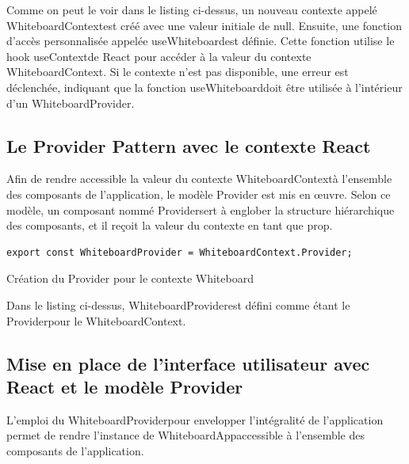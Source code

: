 Comme on peut le voir dans le listing ci-dessus, un nouveau contexte appelé \guillemotleft WhiteboardContext\guillemotright est créé avec une valeur initiale de \guillemotleft null\guillemotright. Ensuite, une fonction d'accès personnalisée appelée \guillemotleft useWhiteboard\guillemotright est définie. Cette fonction utilise le hook \guillemotleft useContext\guillemotright de React pour accéder à la valeur du contexte \guillemotleft WhiteboardContext\guillemotright. Si le contexte n'est pas disponible, une erreur est déclenchée, indiquant que la fonction \guillemotleft useWhiteboard\guillemotright doit être utilisée à l'intérieur d'un \guillemotleft WhiteboardProvider\guillemotright.

\subsection{Le Provider Pattern avec le contexte React}

Afin de rendre accessible la valeur du contexte \guillemotleft WhiteboardContext\guillemotright à l'ensemble des composants de l'application, le modèle Provider est mis en \oe{}uvre. Selon ce modèle, un composant nommé \guillemotleft Provider\guillemotright sert à englober la structure hiérarchique des composants, et il reçoit la valeur du contexte en tant que prop.

\begin{listing}[H]
    \begin{verbatim}
export const WhiteboardProvider = WhiteboardContext.Provider;
  \end{verbatim}
    \caption{Création du Provider pour le contexte Whiteboard}
\end{listing}

Dans le listing ci-dessus, \guillemotleft WhiteboardProvider\guillemotright est défini comme étant le \guillemotleft Provider\guillemotright pour le \guillemotleft WhiteboardContext\guillemotright.

\subsection{Mise en place de l'interface utilisateur avec React et le modèle Provider}

L'emploi du \guillemotleft WhiteboardProvider\guillemotright pour envelopper l'intégralité de l'application permet de rendre l'instance de \guillemotleft WhiteboardApp\guillemotright accessible à l'ensemble des composants de l'application.

